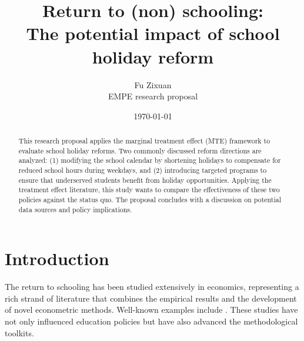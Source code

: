 \documentclass[12pt]{article}
\title{Return to (non) schooling:\\{\large {The potential impact of school holiday reform}}}
\author{Fu Zixuan \\{\small {EMPE research proposal}}}
\date{\today}
\begin{document}
\maketitle
\thispagestyle{empty}
\begin{abstract}
    \noindent  This research proposal applies the marginal treatment effect (MTE) framework to evaluate school holiday reforms. Two commonly discussed reform directions are analyzed: (1) modifying the school calendar by shortening holidays to compensate for reduced school hours during weekdays, and (2) introducing targeted programs to ensure that underserved students benefit from holiday opportunities. Applying the treatment effect literature, this study wants to compare the effectiveness of these two policies against the status quo. The proposal concludes with a discussion on potential data sources and policy implications.
    \bigskip
\end{abstract}

\newpage
\thispagestyle{empty}
\tableofcontents
\newpage

\setcounter{page}{1}

\section{Introduction}

The return to schooling has been studied extensively in economics, representing
a rich strand of literature that combines the empirical results and the
development of novel econometric methods. Well-known examples include
\citet{angrist1991does,imbens1994identification,card2001estimating}. These
studies have not only influenced education policies but have also advanced the
methodological toolkits.
\end{document}
